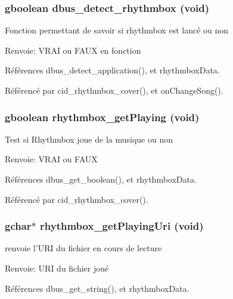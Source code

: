 \subsubsection{\setlength{\rightskip}{0pt plus 5cm}gboolean dbus\_\-detect\_\-rhythmbox (void)}\label{cid-rhythmbox_8h_4e78689f45b1124c082f3f8d1d99381b}


Fonction permettant de savoir si rhythmbox est lancé ou non \begin{Desc}
\item[Renvoie:]VRAI ou FAUX en fonction \end{Desc}


Références dbus\_\-detect\_\-application(), et rhythmboxData.

Référencé par cid\_\-rhythmbox\_\-cover(), et onChangeSong().
\subsubsection{\setlength{\rightskip}{0pt plus 5cm}gboolean rhythmbox\_\-getPlaying (void)}\label{cid-rhythmbox_8h_37c074644bce2e4ed6f1a31c1eac95bb}


Test si Rhythmbox joue de la musique ou non \begin{Desc}
\item[Renvoie:]VRAI ou FAUX \end{Desc}


Références dbus\_\-get\_\-boolean(), et rhythmboxData.

Référencé par cid\_\-rhythmbox\_\-cover().
\subsubsection{\setlength{\rightskip}{0pt plus 5cm}gchar$\ast$ rhythmbox\_\-getPlayingUri (void)}\label{cid-rhythmbox_8h_499eaab9290271017f4ce7526c1873fc}


renvoie l'URI du fichier en cours de lecture \begin{Desc}
\item[Renvoie:]URI du fichier joué \end{Desc}


Références dbus\_\-get\_\-string(), et rhythmboxData.

